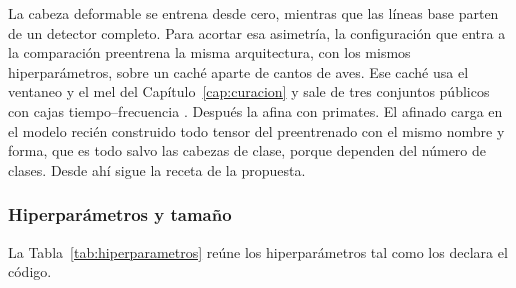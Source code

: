 La cabeza deformable se entrena desde cero, mientras que las líneas base parten
de un detector completo. Para acortar esa asimetría, la configuración que entra a
la comparación preentrena la misma arquitectura, con los mismos hiperparámetros,
sobre un caché aparte de cantos de aves. Ese caché usa el ventaneo y el mel del
Capítulo~\ref{cap:curacion} y sale de tres conjuntos públicos con cajas
tiempo--frecuencia
\citep{chronister_annotated_2021,hopping_collection_2022,ruiz_pteroset_2026}.
Después la afina con primates. El afinado carga en el modelo recién construido
todo tensor del preentrenado con el mismo nombre y forma, que es todo salvo las
cabezas de clase, porque dependen del número de clases. Desde ahí sigue la receta
de la propuesta.

\subsubsection{Hiperparámetros y tamaño}

La Tabla~\ref{tab:hiperparametros} reúne los hiperparámetros tal como los declara
el código.

